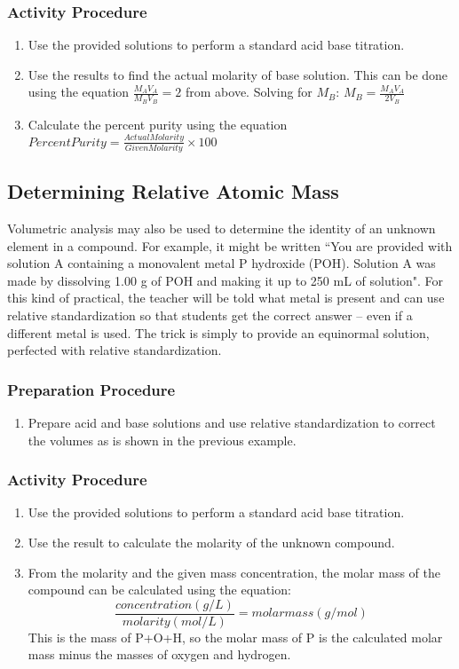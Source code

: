 \subsubsection{Activity Procedure}
\begin{enumerate}
\item {Use the provided solutions to perform a standard acid base titration.}
\item{Use the results to find the actual molarity of base solution. This can be done using the equation 
$\frac{M_A V_A}{M_B V_B} = 2$
from above. Solving for $M_B$:
$M_B = \frac{M_A V_A}{2V_B}$}
\item{Calculate the percent purity using the equation
$Percent Purity = \frac{Actual  Molarity}{Given  Molarity}\times 100$}
\end{enumerate}

\subsection{Determining Relative Atomic Mass}

Volumetric analysis may also be used to determine the identity of an unknown element in a compound. For example, it might be written ``You are provided with solution A containing a monovalent metal P hydroxide (POH). Solution A was made by dissolving 1.00 g of POH and making it up to 250 mL of solution". For this kind of practical, the teacher will be told what metal is present and can use relative standardization so that students get the correct answer -- even if a different metal is used. The trick is simply to provide an equinormal solution, perfected with relative standardization.

\subsubsection{Preparation Procedure}
\begin{enumerate}
\item{Prepare acid and base solutions and use relative standardization to correct the volumes as is shown in the previous example.}
\end{enumerate}
\subsubsection{Activity Procedure}
\begin{enumerate}
\item{Use the provided solutions to perform a standard acid base titration.}
\item{Use the result to calculate the molarity of the unknown compound.}
\item{From the molarity and the given mass concentration, the molar mass of the compound can be calculated using the equation: 
$$\frac{concentration(g/L)}{molarity(mol/L)}={molar mass(g/mol)}$$
This is the mass of P+O+H, so the molar mass of P is the calculated molar mass minus the masses of oxygen and hydrogen.}
\end{enumerate}

